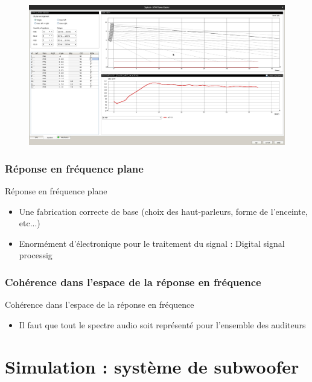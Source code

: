 \documentclass[aspectratio=169]{beamer}
\begin{document}
\begin{frame}
  	\begin{figure}[!h]
	\includegraphics[width=1\textwidth]{figure/linearray_nexo.png}
	\end{figure}
\end{frame}

\subsubsection{Réponse en fréquence plane}
\begin{frame}{Réponse en fréquence plane}
\begin{itemize}
	\item Une fabrication correcte de base (choix des haut-parleurs, forme de l'enceinte, etc...)
	\item Enormément d'électronique pour le traitement du signal : Digital signal processig
\end{itemize}
\end{frame}

\subsubsection{Cohérence dans l'espace de la réponse en fréquence}
\begin{frame}{Cohérence dans l'espace de la réponse en fréquence}
\begin{itemize}
	\item Il faut que tout le spectre audio soit représenté pour l'ensemble des auditeurs
\end{itemize}
\end{frame}

\section{Simulation : système de subwoofer}
\end{document}
